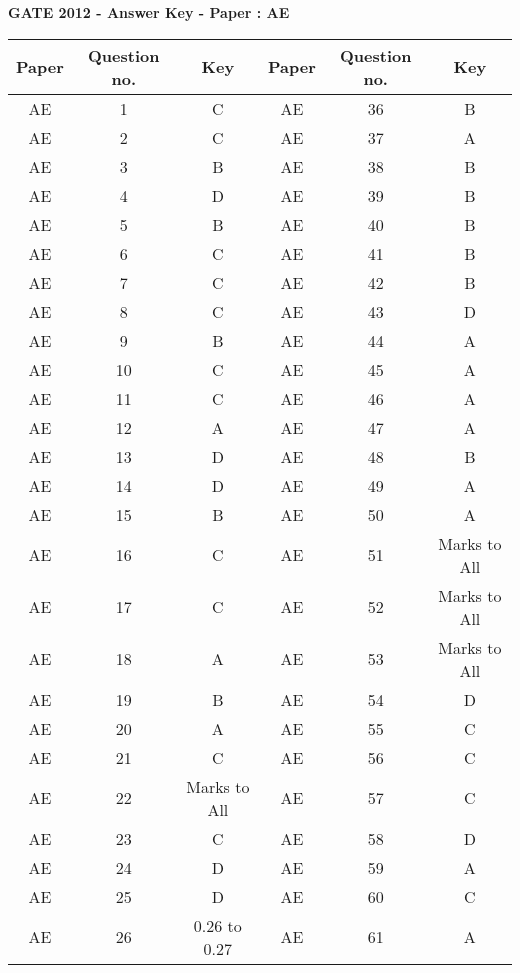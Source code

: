 \begin{center}
\textbf{GATE 2012 - Answer Key - Paper : AE}
\end{center}

\begin{tabular}[12pt]{ |c|c|c|c|c|c| } 
    \hline
    Paper & Question no. & Key & Paper & Question no. & Key \\ 
    \hline
    AE & 1 & C & AE & 36 & B \\
    \hline
    AE & 2 & C & AE & 37 & A \\
    \hline
    AE & 3 & B & AE & 38 & B \\
    \hline
    AE & 4 & D & AE & 39 & B \\
    \hline
    AE & 5 & B & AE & 40 & B \\
    \hline
    AE & 6 & C & AE & 41 & B \\
    \hline
    AE & 7 & C & AE & 42 & B \\
    \hline
    AE & 8 & C & AE & 43 & D \\
    \hline
    AE & 9 & B & AE & 44 & A \\
    \hline
    AE & 10 & C & AE & 45 & A \\
    \hline
    AE & 11 & C & AE & 46 & A \\
    \hline
    AE & 12 & A & AE & 47 & A \\
    \hline
    AE & 13 & D & AE & 48 & B \\
    \hline
    AE & 14 & D & AE & 49 & A \\
    \hline
    AE & 15 & B & AE & 50 & A \\
    \hline
    AE & 16 & C & AE & 51 & Marks to All \\
    \hline
    AE & 17 & C & AE & 52 & Marks to All \\
    \hline
    AE & 18 & A & AE & 53 & Marks to All \\
    \hline
    AE & 19 & B & AE & 54 & D \\
    \hline
    AE & 20 & A & AE & 55 & C \\
    \hline
    AE & 21 & C & AE & 56 & C \\
    \hline
    AE & 22 & Marks to All & AE & 57 & C \\
    \hline
    AE & 23 & C & AE & 58 & D \\
    \hline
    AE & 24 & D & AE & 59 & A \\
    \hline
    AE & 25 & D & AE & 60 & C \\
    \hline
    AE & 26 & 0.26 to 0.27 & AE & 61 & A \\

\end{tabular}
